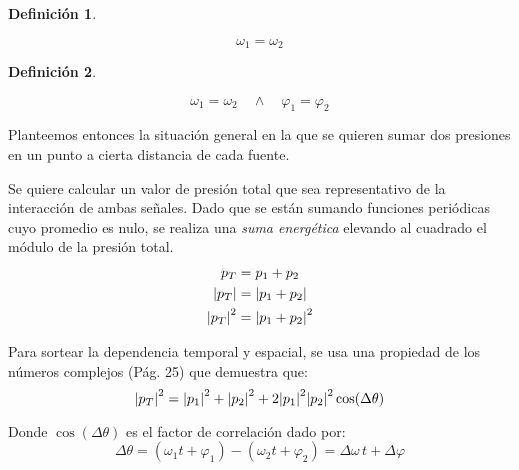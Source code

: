 \documentclass[a5paper,12pt,twoside]{book}
\newtheorem{defn}{{Definición}}[chapter]
\begin{document}
\begin{mdframed}[style=DefinitionFrame]
    \begin{defn}
    \end{defn}
    \begin{equation*}
        \omega_1=\omega_2
    \end{equation*}
\end{mdframed}

\begin{mdframed}[style=DefinitionFrame]
    \begin{defn}
    \end{defn}
    \begin{equation*}
        \omega_1=\omega_2 \quad \land \quad \varphi_1=\varphi_2
    \end{equation*}
\end{mdframed}

Planteemos entonces la situación general en la que se quieren sumar dos presiones en un punto a cierta distancia de cada fuente.

Se quiere calcular un valor de presión total que sea representativo de la interacción de ambas señales.
Dado que se están sumando funciones periódicas cuyo promedio es nulo, se realiza una \emph{suma energética} elevando al cuadrado el módulo de la presión total.
\begin{align*}
    p_T &= p_1 + p_2
    \\
    {\left| {p_T} \right|} &= {\left| {p_1 + p_2} \right|}
    \\
    {\left| {p_T} \right|}^2 &= {\left| {p_1 + p_2} \right|}^2
\end{align*}

Para sortear la dependencia temporal y espacial, se usa una propiedad de los números complejos \cite{2} (Pág. 25) que demuestra que:
\begin{equation}
    {\left| {p_T} \right|}^2 = {\left| {p_1} \right|}^2 + {\left| {p_2} \right|}^2 + 2 {\left| {p_1} \right|}^2 {\left| {p_2} \right|}^2 \cos(\Delta \theta)
    \label{eqn:|P_T|^2}
\end{equation}

Donde $\cos(\Delta \theta)$ es el factor de correlación dado por:
\begin{equation*}
    \Delta \theta = \left( \omega_1 t + \varphi_1 \right) - \left( \omega_2 t + \varphi_2 \right) = \Delta \omega \, t + \Delta \varphi
\end{equation*}
\end{document}
